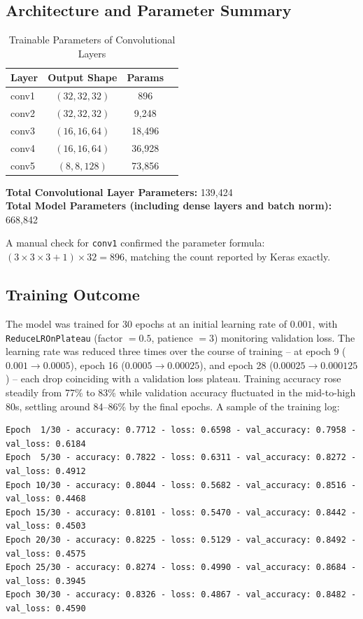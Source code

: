\documentclass[11pt]{article}
\begin{document}
\subsection*{Architecture and Parameter Summary}

\begin{table}[H]
\centering
\caption{Trainable Parameters of Convolutional Layers}
\begin{tabular}{lccc}
\toprule
Layer & Output Shape & Params \\
\midrule
conv1 & $(32,32,32)$ & 896 \\
conv2 & $(32,32,32)$ & 9{,}248 \\
conv3 & $(16,16,64)$ & 18{,}496 \\
conv4 & $(16,16,64)$ & 36{,}928 \\
conv5 & $(8,8,128)$ & 73{,}856 \\
\bottomrule
\end{tabular}
\end{table}

\textbf{Total Convolutional Layer Parameters:} 139,424\\
\textbf{Total Model Parameters (including dense layers and batch norm):} 668,842

A manual check for \texttt{conv1} confirmed the parameter formula: $(3 \times 3 \times 3 + 1) \times 32 = 896$, matching the count reported by Keras exactly.

\subsection*{Training Outcome}

The model was trained for 30 epochs at an initial learning rate of $0.001$, with \texttt{ReduceLROnPlateau} (factor $=0.5$, patience $=3$) monitoring validation loss. The learning rate was reduced three times over the course of training -- at epoch 9 ($0.001 \rightarrow 0.0005$), epoch 16 ($0.0005 \rightarrow 0.00025$), and epoch 28 ($0.00025 \rightarrow 0.000125$) -- each drop coinciding with a validation loss plateau. Training accuracy rose steadily from 77\% to 83\% while validation accuracy fluctuated in the mid-to-high 80s, settling around 84--86\% by the final epochs. A sample of the training log:

\begin{verbatim}
Epoch  1/30 - accuracy: 0.7712 - loss: 0.6598 - val_accuracy: 0.7958 - val_loss: 0.6184
Epoch  5/30 - accuracy: 0.7822 - loss: 0.6311 - val_accuracy: 0.8272 - val_loss: 0.4912
Epoch 10/30 - accuracy: 0.8044 - loss: 0.5682 - val_accuracy: 0.8516 - val_loss: 0.4468
Epoch 15/30 - accuracy: 0.8101 - loss: 0.5470 - val_accuracy: 0.8442 - val_loss: 0.4503
Epoch 20/30 - accuracy: 0.8225 - loss: 0.5129 - val_accuracy: 0.8492 - val_loss: 0.4575
Epoch 25/30 - accuracy: 0.8274 - loss: 0.4990 - val_accuracy: 0.8684 - val_loss: 0.3945
Epoch 30/30 - accuracy: 0.8326 - loss: 0.4867 - val_accuracy: 0.8482 - val_loss: 0.4590
\end{verbatim}
\end{document}
